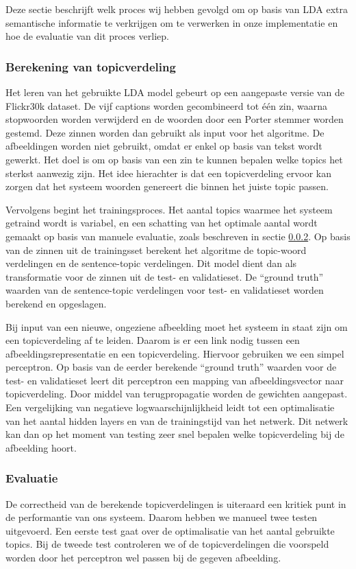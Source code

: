  Deze sectie beschrijft welk proces wij hebben gevolgd om op basis van LDA extra semantische informatie te verkrijgen om te verwerken in onze implementatie en hoe de evaluatie van dit proces verliep.

\subsubsection{Berekening van topicverdeling}
\label{subs:Berekening van topicverdeling}
Het leren van het gebruikte LDA model gebeurt op een aangepaste versie van de Flickr30k dataset. De vijf captions worden gecombineerd tot \'e\'en zin, waarna stopwoorden worden verwijderd en de woorden door een Porter stemmer worden gestemd. Deze zinnen worden dan gebruikt als input voor het algoritme. De afbeeldingen worden niet gebruikt, omdat er enkel op basis van tekst wordt gewerkt. Het doel is om op basis van een zin te kunnen bepalen welke topics het sterkst aanwezig zijn. Het idee hierachter is dat een topicverdeling ervoor kan zorgen dat het systeem woorden genereert die binnen het juiste topic passen.

Vervolgens begint het trainingsproces. Het aantal topics waarmee het systeem getraind wordt is variabel, en een schatting van het optimale aantal wordt gemaakt op basis van manuele evaluatie, zoals beschreven in sectie \ref{subs:Evaluatie}. Op basis van de zinnen uit de trainingsset berekent het algoritme de topic-woord verdelingen en de sentence-topic verdelingen. Dit model dient dan als transformatie voor de zinnen uit de test- en validatieset. De ``ground truth'' waarden van de sentence-topic verdelingen voor test- en validatieset worden berekend en opgeslagen.

Bij input van een nieuwe, ongeziene afbeelding moet het systeem in staat zijn om een topicverdeling af te leiden. Daarom is er een link nodig tussen een afbeeldingsrepresentatie en een topicverdeling. Hiervoor gebruiken we een simpel perceptron. Op basis van de eerder berekende ``ground truth'' waarden voor de test- en validatieset leert dit perceptron een mapping van afbeeldingsvector naar topicverdeling. Door middel van terugpropagatie worden de gewichten aangepast. Een vergelijking van negatieve logwaarschijnlijkheid leidt tot een optimalisatie van het aantal hidden layers en van de trainingstijd van het netwerk. Dit netwerk kan dan op het moment van testing zeer snel bepalen welke topicverdeling bij de afbeelding hoort.

\subsubsection{Evaluatie}
\label{subs:Evaluatie}
De correctheid van de berekende topicverdelingen is uiteraard een kritiek punt in de performantie van ons systeem. Daarom hebben we manueel twee testen uitgevoerd. Een eerste test gaat over de optimalisatie van het aantal gebruikte topics. Bij de tweede test controleren we of de topicverdelingen die voorspeld worden door het perceptron wel passen bij de gegeven afbeelding.

